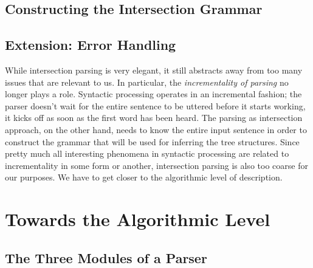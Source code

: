 \subsection{Constructing the Intersection Grammar}

\subsection{Extension: Error Handling}

While intersection parsing is very elegant, it still abstracts away from too many issues that are relevant to us.
In particular, the \emph{incrementality of parsing} no longer plays a role.
Syntactic processing operates in an incremental fashion;
the parser doesn't wait for the entire sentence to be uttered before it starts working, it kicks off as soon as the first word has been heard.
The parsing as intersection approach, on the other hand, needs to know the entire input sentence in order to construct the grammar that will be used for inferring the tree structures.
Since pretty much all interesting phenomena in syntactic processing are related to incrementality in some form or another, intersection parsing is also too coarse for our purposes.
We have to get closer to the algorithmic level of description.


\section{Towards the Algorithmic Level}
\label{sec:ParserOverview_AlgorithmicLevel}

\subsection{The Three Modules of a Parser}
\label{sub:ParserOverview_Modules}


